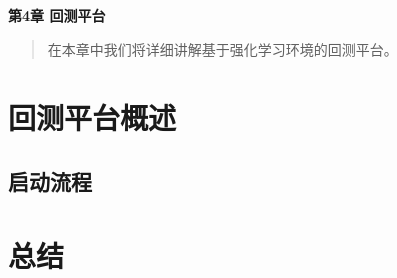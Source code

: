 \newpage
\maketitle
\begin{center}
\Large \textbf{第4章 回测平台} \quad 
\end{center}
\begin{abstract}
在本章中我们将详细讲解基于强化学习环境的回测平台。
\end{abstract}
\section{回测平台概述}
\subsection{启动流程}

\section{总结}
